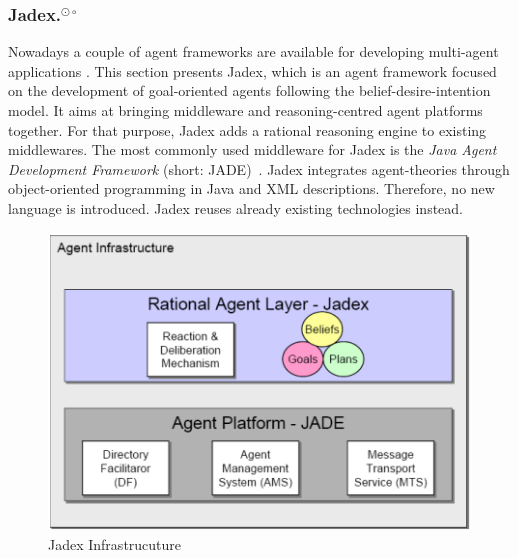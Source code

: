 \subsubsection[Jadex.]{Jadex.$^{\odot\circ}$}\label{fun:apl_jadex}
Nowadays a couple of agent frameworks are available for developing multi-agent applications \cite{Mangina}. %
This section presents Jadex, which is an agent framework focused on the development of goal-oriented agents following the belief-desire-intention model.
It aims at bringing middleware and reasoning-centred agent platforms together.
For that purpose, Jadex adds a rational reasoning engine to existing middlewares.
The most commonly used middleware for Jadex is the \emph{Java Agent Development Framework} (short: JADE)~\cite{bellifemine_jade_2005}. %
Jadex integrates agent-theories through object-oriented programming in Java and XML descriptions.
Therefore, no new language is introduced.
Jadex reuses already existing technologies instead.
\begin{figure}
	\centering
	\includegraphics{images/Jadex_infrastructure.png}
	\caption{Jadex Infrastrucuture}
	\label{fig1}
\end{figure}

